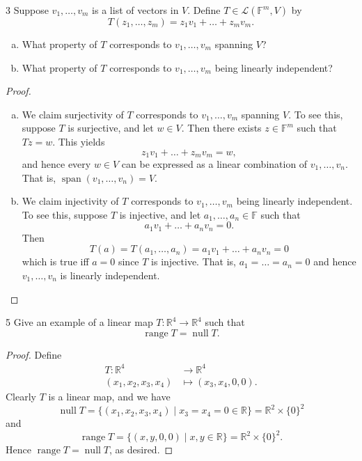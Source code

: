 \documentclass{extarticle}
\newenvironment{problem}[1]{\begin{prob*}{#1}{}}{\end{prob*}}
\newcommand{\R}{\mathbb{R}}
\newcommand{\F}{\mathbb{F}}
\DeclareMathOperator{\Span}{span}
\newcommand{\Hom}{\mathcal{L}}
\DeclareMathOperator{\Null}{null}
\DeclareMathOperator{\Range}{range}
\begin{document}
\begin{problem}{3}
Suppose $v_1,\dots,v_m$ is a list of vectors in $V$.  Define $T\in\Hom(\F^m, V)$ by
\begin{equation*}
T(z_1,\dots, z_m) = z_1v_1 + \dots + z_m v_m.
\end{equation*}
\begin{enumerate}[(a)]
\item What property of $T$ corresponds to $v_1,\dots, v_m$ spanning $V$?
\item What property of $T$ corresponds to $v_1,\dots, v_m$ being linearly independent?
\end{enumerate}
\end{problem}
\begin{proof}
\begin{enumerate}[(a)]
\item We claim surjectivity of $T$ corresponds to $v_1,\dots, v_m$ spanning $V$.  To see this, suppose $T$ is surjective, and let $w\in V$.  Then there exists $z\in \F^m$ such that $Tz = w$.  This yields 
\begin{equation*}
z_1v_1 + \dots + z_m v_m = w,
\end{equation*}
and hence every $w\in V$ can be expressed as a linear combination of $v_1,\dots, v_n$.  That is, $\Span(v_1,\dots,v_n)= V$.
\item We claim injectivity of $T$ corresponds to $v_1,\dots, v_m$ being linearly independent.  To see this, suppose $T$ is injective, and let $a_1,\dots, a_n\in\F$ such that 
\begin{equation*}
a_1v_1 + \dots + a_nv_n = 0.
\end{equation*}
Then 
\begin{equation*}
T(a) = T(a_1,\dots, a_n) = a_1v_1 + \dots + a_nv_n = 0
\end{equation*}
which is true iff $a = 0$ since $T$ is injective.  That is, $a_1=\dots = a_n=0$ and hence $v_1,\dots, v_n$ is linearly independent. \qedhere
\end{enumerate}
\end{proof}

\begin{problem}{5}
Give an example of a linear map $T:\R^4\to\R^4$ such that 
\begin{equation*}
\Range T = \Null T.
\end{equation*}
\end{problem}
\begin{proof}
Define
\begin{align*}
T: \R^4 &\to \R^4\\
(x_1,x_2,x_3,x_4) &\mapsto (x_3, x_4, 0, 0).
\end{align*}
Clearly $T$ is a linear map, and we have
\begin{equation*}
\Null T =\{(x_1, x_2, x_3, x_4)\mid x_3 = x_4 = 0\in\R\} = \R^2\times \{0\}^2
\end{equation*}
and 
\begin{equation*}
\Range T = \{(x, y, 0, 0)\mid x, y\in\R\} = \R^2 \times \{0\}^2.
\end{equation*}
Hence $\Range T = \Null T$, as desired.
\end{proof}
\end{document}
